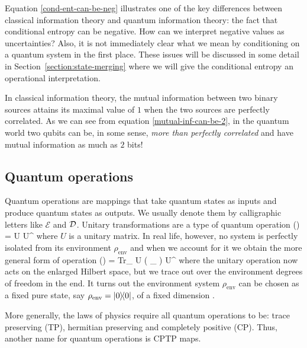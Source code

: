\documentclass[aps,11pt,twoside,letterpaper]{article}
\def \Tr{\textup{Tr}}
\def\E{\mathcal{E}}
\theoremstyle{plain}
\theoremstyle{definition}
\begin{document}
			Equation \eqref{cond-ent-can-be-neg} illustrates one of the key differences between classical information
			theory and quantum information theory: the fact that conditional entropy can be negative.
			How can we interpret negative values as uncertainties? Also, it is not immediately clear what we mean by
			conditioning on a quantum system in the first place. These issues will be discussed in some detail in 
			Section~\ref{section:state-merging} where we will give the conditional entropy an operational interpretation.
			
			In classical information theory, the mutual information between two binary sources attains its maximal value
			of $1$ when the two sources are perfectly correlated. As we can see from equation 
			\eqref{mutual-inf-can-be-2}, in the quantum world two qubits can be, in some sense,
			\emph{more than perfectly correlated} and have mutual information as much as $2$ bits!
			
			



		
		\subsection{Quantum operations}	

			Quantum operations are mappings that take quantum states as inputs and produce quantum
			states as outputs. We usually denote them by calligraphic letters like $\E$ and ${\cal D}$.
			Unitary transformations are a type of quantum operation
			\be
				\E(\rho) = U \rho U^{\dag}
			\ee
			where $U$ is a unitary matrix.
			In real life, however, no system is perfectly isolated from its environment $\rho_{\text{env}}$ 
			and when we account for it we obtain the more general form of operation 
			\be
				\E(\rho) = \Tr_{} U \left( \rho \otimes \rho_{} \right) U^{\dag}
			\ee
			where the unitary operation now acts on the enlarged Hilbert space, but we trace out over the
			environment degrees of freedom in the end. It turns out the environment system $\rho_{\text{env}}$
			can be chosen as a fixed pure state, say $\rho_{\text{env}} = | 0 \rangle\!\langle 0 |$, of a fixed dimension \cite{NC04}.

			More generally, the laws of physics require all quantum operations to be:
			trace preserving (TP), hermitian preserving and completely positive (CP).
			Thus, another name for quantum operations is CPTP maps.
									
\end{document}
